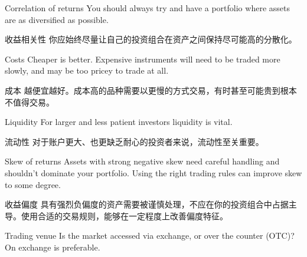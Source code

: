 \bipairgap

\begin{englishblock} Correlation of returns You should always try and have a portfolio where assets are as diversified as possible. \end{englishblock}

\begin{chineseblock}收益相关性 你应始终尽量让自己的投资组合在资产之间保持尽可能高的分散化。\end{chineseblock}

\bipairgap

\begin{englishblock} Costs Cheaper is better. Expensive instruments will need to be traded more slowly, and may be too pricey to trade at all. \end{englishblock}

\begin{chineseblock}成本 越便宜越好。成本高的品种需要以更慢的方式交易，有时甚至可能贵到根本不值得交易。\end{chineseblock}

\bipairgap

\begin{englishblock} Liquidity For larger and less patient investors liquidity is vital. \end{englishblock}

\begin{chineseblock}流动性 对于账户更大、也更缺乏耐心的投资者来说，流动性至关重要。\end{chineseblock}

\bipairgap

\begin{englishblock} Skew of returns Assets with strong negative skew need careful handling and shouldn't dominate your portfolio. Using the right trading rules can improve skew to some degree. \end{englishblock}

\begin{chineseblock}收益偏度 具有强烈负偏度的资产需要被谨慎处理，不应在你的投资组合中占据主导。使用合适的交易规则，能够在一定程度上改善偏度特征。\end{chineseblock}

\bipairgap

\begin{englishblock} Trading venue Is the market accessed via exchange, or over the counter (OTC)? On exchange is preferable. \end{englishblock}

